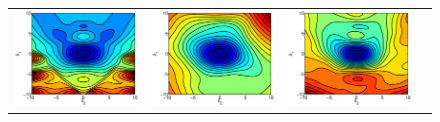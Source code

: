\documentclass{iopart}
\begin{document}
\begin{figure}
\centering
\begin{tabular}{cccc}
\includegraphics[scale=.2]{./figs/2D_exp0_i}&
\includegraphics[scale=.2]{./figs/2D_exp0_j}&
\includegraphics[scale=.2]{./figs/2D_exp0_k}&

\end{tabular}
\end{figure}
\end{document}
